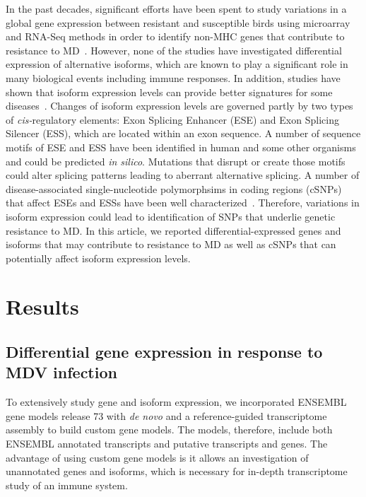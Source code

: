 \documentclass[10pt]{article}
\begin{document}
In the past decades, significant efforts have been spent to study variations in
a global gene expression between resistant and susceptible birds using
microarray and RNA-Seq methods in order to identify non-MHC genes that
contribute to resistance to MD~\cite{}.  However, none of the studies have
investigated differential expression of alternative isoforms, which are known to
play a significant role in many biological events including immune responses.
In addition, studies have shown that isoform expression levels can provide
better signatures for some diseases~\cite{zhang2013isoform}.  Changes of isoform
expression levels are governed partly by two types of {\em cis-}regulatory
elements: Exon Splicing Enhancer (ESE) and Exon Splicing Silencer (ESS), which
are located within an exon sequence.  A number of sequence motifs of ESE and ESS
have been identified in human and some other organisms and could be predicted
{\em in silico}.  Mutations that disrupt or create those motifs could alter
splicing patterns leading to aberrant alternative splicing.  A number of
disease-associated single-nucleotide polymorphsims in coding regions (cSNPs)
that affect ESEs and ESSs have been well characterized~\cite{blencowe2000exonic,
wang2007splicing}.
Therefore, variations in isoform expression could lead to identification of SNPs
that underlie genetic resistance to MD.  In this article, we reported
differential-expressed genes and isoforms that may contribute to resistance to
MD as well as cSNPs that can potentially affect isoform expression levels.


\section*{Results}

\subsection*{Differential gene expression in response to MDV infection}

To extensively study gene and isoform expression, we incorporated ENSEMBL gene
models release 73 with {\em de novo} and a reference-guided transcriptome
assembly to build custom gene models.  The models, therefore, include both
ENSEMBL annotated transcripts and putative transcripts and genes.  The advantage
of using custom gene models is it allows an investigation of unannotated genes
and isoforms, which is necessary for in-depth transcriptome study of an immune
system.
\end{document}

